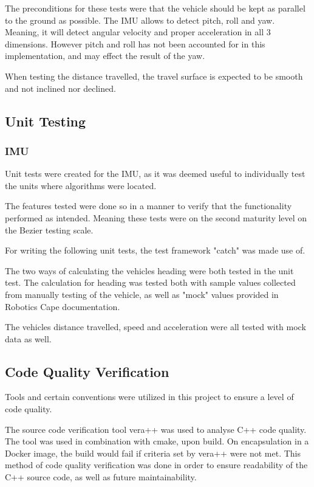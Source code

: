 \documentclass[12pt]{article}
\begin{document}
The preconditions for these tests were that the vehicle should be kept as parallel to the ground as possible. The IMU allows to detect pitch, roll and yaw. Meaning, it will detect angular velocity and proper acceleration in all 3 dimensions. However pitch and roll has not been accounted for in this implementation, and may effect the result of the yaw.

When testing the distance travelled, the travel surface is expected to be smooth and not inclined nor declined. 

\subsection{Unit Testing}
\subsubsection{IMU}
Unit tests were created for the IMU, as it was deemed useful to individually test the units where algorithms were located. 

The features tested were done so in a manner to verify that the functionality performed as intended. Meaning these tests were on the second maturity level on the Bezier testing scale\cite{BezierTestingLevels}. 

For writing the following unit tests, the test framework "catch"\cite{catchframework} was made use of. 

The two ways of calculating the vehicles heading were both tested in the unit test. 
The calculation for heading was tested both with sample values collected from manually testing of the vehicle, as well as "mock" values provided in Robotics Cape documentation\cite{robotics cape}.

The vehicles distance travelled, speed and acceleration were all tested with mock data as well. 

\subsection{Code Quality Verification}
Tools and certain conventions were utilized in this project to ensure a level of code quality. 

The source code verification tool vera++\cite{vera++} was used to analyse C++ code quality. The tool was used in combination with cmake, upon build. On encapsulation in a Docker image, the build would fail if criteria set by vera++ were not met.  This method of code quality verification was done in order to ensure readability of the C++ source code, as well as future maintainability. 
\end{document}
